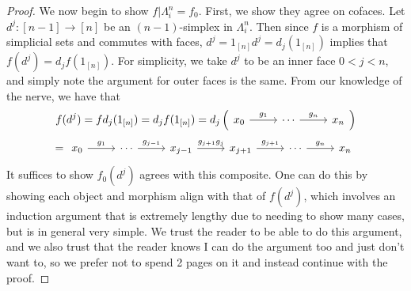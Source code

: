 \begin{proof}
	We now begin to show $f|\Lambda_i^n=f_0$. First, we show they agree on cofaces. Let $d^j : [n-1] \to [n]$ be an $(n-1)$-simplex in $\Lambda_i^n$. Then since $f$ is a morphism of simplicial sets and commutes with faces, $d^j=1_{[n]} d^j=d_j(1_{[n]} )$ implies that $f(d^j)=d_jf(1_{[n]} )$. For simplicity, we take $d^j$ to be an inner face $0<j<n$, and simply note the argument for outer faces is the same. From our knowledge of the nerve, we have that
	\[f(d^j)=fd_j(1_{[n]} )=d_jf(1_{[n]} )=d_j\left(
		\begin{tikzcd}[row sep = 2.5em, column sep = 2.5em]
			{x_0} \ar[" g_1 ", r]  & {\cdots} \ar[" g_n ", r] & {x_n}
		\end{tikzcd}
\right)\]
	\[=\begin{tikzcd}[row sep = 2.5em, column sep = 2.5em]
						    {x_0} \ar[" g_1 ", r]  & {\cdots} \ar[" g_{j-1}  ", r] & {x_{j-1}} \ar[" g_{j+1} g_j ", r]  & {x_{j+1}} \ar[" g_{j+1}  ", r]  & {\cdots} \ar[" g_n ", r] & {x_n}
	\end{tikzcd}\]
	It suffices to show $f_0(d^j)$ agrees with this composite. One can do this by showing each object and morphism align with that of $f(d^j)$, which involves an induction argument that is extremely lengthy due to needing to show many cases, but is in general very simple. We trust the reader to be able to do this argument, and we also trust that the reader knows I can do the argument too and just don't want to, so we prefer not to spend 2 pages on it and instead continue with the proof.	
		


\end{proof}
